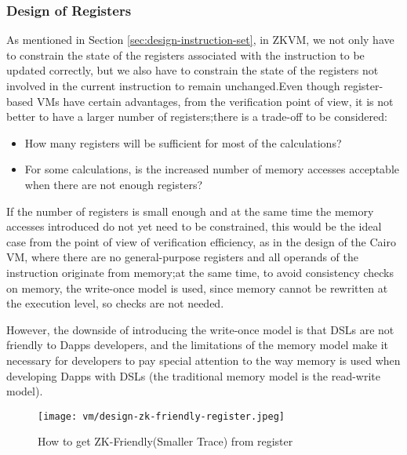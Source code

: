 \subsubsection{Design of Registers} \label{sec:design-registers}

As mentioned in Section \ref{sec:design-instruction-set}, in ZKVM, we not only have to constrain the state of the registers associated with
the instruction to be updated correctly, but we also have to constrain the state of the registers not involved in the current
instruction to remain unchanged.Even though register-based VMs have certain advantages, from the verification point of view,
it is not better to have a larger number of registers;there is a trade-off to be considered:

\begin{itemize}
    \item How many registers will be sufficient for most of the calculations?
    \item For some calculations, is the increased number of memory accesses acceptable when there are not enough registers?
\end{itemize}

If the number of registers is small enough and at the same time the memory accesses introduced do not yet need to be constrained,
this would be the ideal case from the point of view of verification efficiency, as in the design of the Cairo VM, where there are
no general-purpose registers and all operands of the instruction originate from memory;at the same time, to avoid consistency checks
on memory, the write-once model is used, since memory cannot be rewritten at the execution level, so checks are not needed.

However, the downside of introducing the write-once model is that DSLs are not friendly to Dapps developers, and the limitations of
the memory model make it necessary for developers to pay special attention to the way memory is used when developing Dapps with DSLs
(the traditional memory model is the read-write model).

\begin{figure}[!ht]
    \centering
    \texttt{[image: vm/design-zk-friendly-register.jpeg]}
    \caption{How to get ZK-Friendly(Smaller Trace) from register}
    \label{fig:design-zk-friendly-register}
\end{figure}

